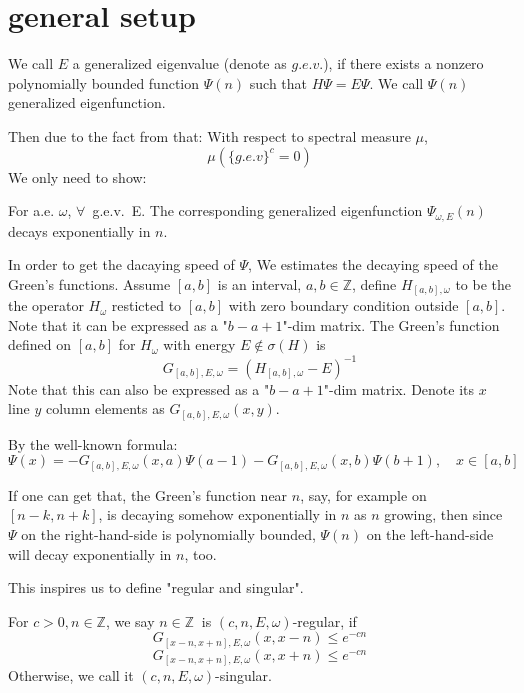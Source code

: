 \section{general setup}

\begin{definition}[$g.e.v.$]
    We call $E$ a generalized eigenvalue (denote as $g.e.v.$), if there exists a nonzero polynomially bounded function $\Psi(n)$ such that $H\Psi=E\Psi$. We call $\Psi(n)$ generalized eigenfunction.
\end{definition}
Then due to the fact from \cite{simon1982schrodinger} that:
With respect to spectral measure $\mu$,
\[
\mu (\{g.e.v\}^c=0)
\]
We only need to show:
\begin{thm}\label{thm1}
  For a.e. $\omega$, $\forall$~g.e.v.~E. The corresponding generalized eigenfunction $\Psi_{\omega,E}(n)$ decays exponentially in $n$.
\end{thm}

In order to get the dacaying speed of $\Psi$, We estimates the decaying speed of the Green's functions. Assume $[a,b]$ is an interval, $a,b\in\mathbb{Z}$, define $H_{[a,b],\omega}$ to be the the operator $H_\omega$ resticted to $[a,b]$ with zero boundary condition outside $[a,b]$. Note that it can be expressed as a "$b-a+1$"-dim matrix.
The Green's function defined on $[a,b]$ for $H_\omega$ with energy $E\notin\sigma(H)$ is
  \[
    G_{[a,b],E,\omega}=(H_{[a,b],\omega}-E)^{-1}
  \]
Note that this can also be expressed as a "$b-a+1$"-dim matrix. Denote its $x$ line $y$ column elements as $G_{[a,b],E,\omega}(x,y)$.

By the well-known formula:
  \begin{equation}\label{possion}
    \Psi(x)=-G_{[a,b],E,\omega}(x,a)\Psi(a-1)-G_{[a,b],E,\omega}(x,b)\Psi(b+1),\quad x\in[a,b]
  \end{equation}

If one can get that, the Green's function near $n$, say, for example on $[n-k,n+k]$, is decaying somehow exponentially in $n$ as $n$ growing, then since $\Psi$ on the  right-hand-side is polynomially bounded, $\Psi(n)$ on the left-hand-side will decay exponentially in $n$, too.

This inspires us to define "regular and singular".

\begin{definition}
   For $c>0, n\in\mathbb{Z}$, we say $n\in\mathbb{Z}~$ is $(c,n,E,\omega)$-regular, if
  \[
    G_{[x-n,x+n],E,\omega}(x,x-n) \leq e^{-cn}
  \]
  \[
    G_{[x-n,x+n],E,\omega}(x,x+n) \leq e^{-cn}
  \]
  Otherwise, we call it $(c,n,E,\omega)$-singular.
\end{definition}

